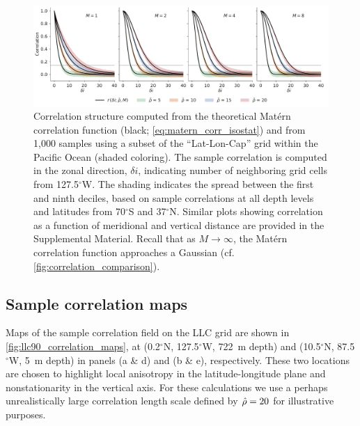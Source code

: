 \begin{figure}
    \centering
    \includegraphics[width=\textwidth]{../figures/matern_llc90_correlation_theory_vs_m_ix.pdf}
    \caption{Correlation structure computed from the theoretical Mat\'ern
        correlation function (black; \cref{eq:matern_corr_isostat}) and from
        1,000 samples using a subset of the ``Lat-Lon-Cap'' grid within the
        Pacific Ocean (shaded coloring).
        The sample correlation is computed in the zonal direction, $\delta i$,
        indicating number of neighboring grid cells from
        127.5$^\circ$W.
        The shading indicates the spread between the first and ninth deciles,
        based on sample correlations at all depth levels and latitudes from
        70$^\circ$S and 37$^\circ$N.
        Similar plots showing correlation as a function of meridional and
        vertical distance are provided in the Supplemental Material.
        Recall that as $M\rightarrow\infty$, the Mat\'ern correlation function
        approaches a Gaussian (cf. \cref{fig:correlation_comparison}).
    }
    \label{fig:llc90_correlations}
\end{figure}

\subsection{Sample correlation maps}
\label{ssec:llc90_correlation_maps}

Maps of the sample correlation field on the LLC grid are shown in
\cref{fig:llc90_correlation_maps}, at
(0.2$^\circ$N, 127.5$^\circ$W, 722~m depth) and
(10.5$^\circ$N, 87.5$^\circ$W, 5~m depth) in panels (a \& d) and (b \& e), respectively.
These two locations are chosen to highlight local anisotropy in the
latitude-longitude plane and nonstationarity in the vertical axis.
For these calculations we use a perhaps unrealistically large correlation length scale
defined by $\hat{\rho}=20$ for illustrative purposes.

